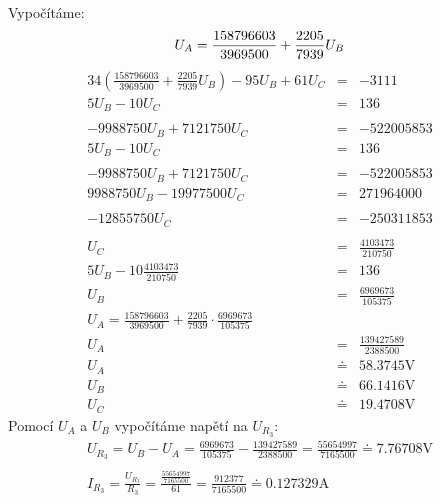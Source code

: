 \documentclass[12pt,a4paper]{article}
\begin{document}
Vypočítáme:
$$U_A=\frac{158796603}{3969500}+\frac{2205}{7939}U_B\\$$
\begin{eqnarray*}
34(\frac{158796603}{3969500}+\frac{2205}{7939}U_B)-95U_B+61U_C &=& -3111\\
5U_B - 10U_C &=& 136\\\\
-9988750U_B+7121750U_C &=& -522005853\\
5U_B - 10U_C &=&136\\\\
-9988750U_B+7121750U_C &=& -522005853\\
9988750U_B-19977500U_C &=& 271964000\\\\
-12855750U_C &=& -250311853\\\\
U_C &=& \frac{4103473}{210750}\\[1cm]
5U_B-10\frac{4103473}{210750} &=&136\\
U_B &=& \frac{6969673}{105375}\\[1cm]
U_A = \frac{158796603}{3969500}+\frac{2205}{7939}\cdot\frac{6969673}{105375}\\
U_A &=& \frac{139427589}{2388500}\\[1cm]
U_A &\doteq& 58.3745\text{V}\\
U_B &\doteq& 66.1416\text{V}\\
U_C &\doteq& 19.4708 \text{V}
\end{eqnarray*}
Pomocí $U_A$ a $U_B$ vypočítáme napětí na $U_{R_3}$:
\begin{gather*}
U_{R_3} = U_B-U_A = \frac{6969673}{105375}-\frac{139427589}{2388500}=\frac{55654997}{7165500} \doteq 7.76708\text{V}\\\\
I_{R_3} = \frac{U_{R_3}}{R_3}=\frac{\frac{55654997}{7165500}}{61}=\frac{912377}{7165500}\doteq0.127329\text{A}
\end{gather*}
\pagebreak
\end{document}
